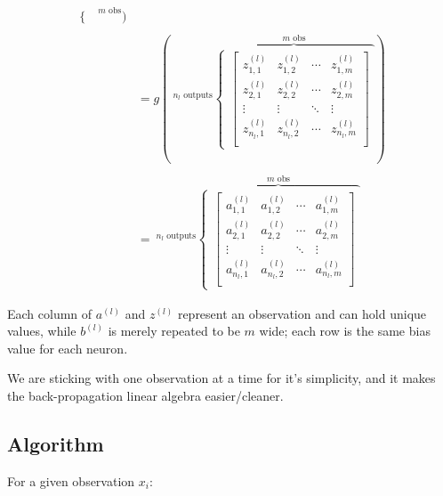 \documentclass[
]{book}
\begin{document}
\[\begin{aligned}
{\begin{cases}
  \end{cases} 
}^{m \text{ obs}}) \\ \\
&= g\left(\ ^{n_l \text{ outputs}}
\overbrace{
  \begin{cases}
    \begin{bmatrix}
    z^{(l)}_{1, 1} & z^{(l)}_{1, 2} & \cdots & z^{(l)}_{1, m} \\
    z^{(l)}_{2, 1} & z^{(l)}_{2, 2} & \cdots & z^{(l)}_{2, m} \\
    \vdots & \vdots & \ddots & \vdots \\
    z^{(l)}_{n_l, 1} & z^{(l)}_{n_l, 2} & \cdots & z^{(l)}_{n_l, m} \\
    \end{bmatrix}
  \end{cases} 
}^{m \text{ obs}}\right) \\ \\
&= \ ^{n_l \text{ outputs}}
\overbrace{
  \begin{cases}
    \begin{bmatrix}
    a^{(l)}_{1, 1} & a^{(l)}_{1, 2} & \cdots & a^{(l)}_{1, m} \\
    a^{(l)}_{2, 1} & a^{(l)}_{2, 2} & \cdots & a^{(l)}_{2, m} \\
    \vdots & \vdots & \ddots & \vdots \\
    a^{(l)}_{n_l, 1} & a^{(l)}_{n_l, 2} & \cdots & a^{(l)}_{n_l, m} \\
    \end{bmatrix}
  \end{cases} 
}^{m \text{ obs}}
\end{aligned}
\]

Each column of \(a^{(l)}\) and \(z^{(l)}\) represent an observation and can hold unique values, while \(b^{(l)}\) is merely repeated to be \(m\) wide; each row is the same bias value for each neuron.

We are sticking with one observation at a time for it's simplicity, and it makes the back-propagation linear algebra easier/cleaner.

\hypertarget{algorithm}{%
\subsection{Algorithm}\label{algorithm}}

For a given observation \(x_i\):
\end{document}
